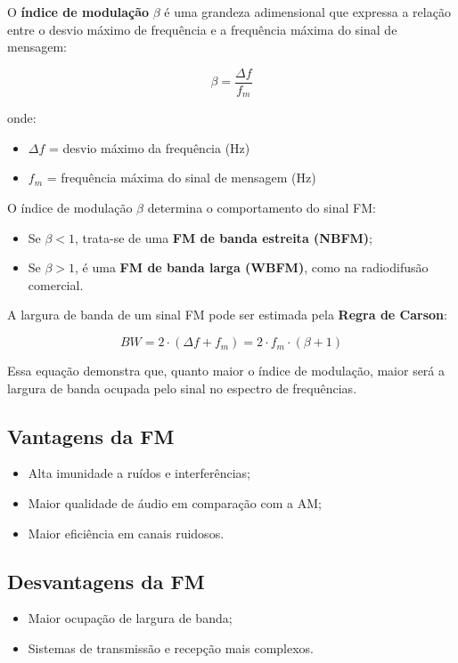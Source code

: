 O \textbf{índice de modulação} $\beta$ é uma grandeza adimensional que expressa a relação entre o desvio máximo de frequência e a frequência máxima do sinal de mensagem:

\begin{equation}
\beta = \frac{\Delta f}{f_m}
\end{equation}

onde:
\begin{itemize}
    \item $\Delta f$ = desvio máximo da frequência (Hz)
    \item $f_m$ = frequência máxima do sinal de mensagem (Hz)
\end{itemize}

O índice de modulação $\beta$ determina o comportamento do sinal FM:
\begin{itemize}
    \item Se $\beta < 1$, trata-se de uma \textbf{FM de banda estreita (NBFM)};
    \item Se $\beta > 1$, é uma \textbf{FM de banda larga (WBFM)}, como na radiodifusão comercial.
\end{itemize}

A largura de banda de um sinal FM pode ser estimada pela \textbf{Regra de Carson}:

\begin{equation}
BW = 2 \cdot (\Delta f + f_m) = 2 \cdot f_m \cdot (\beta + 1)
\end{equation}

Essa equação demonstra que, quanto maior o índice de modulação, maior será a largura de banda ocupada pelo sinal no espectro de frequências.

\subsection*{Vantagens da FM}
\begin{itemize}
    \item Alta imunidade a ruídos e interferências;
    \item Maior qualidade de áudio em comparação com a AM;
    \item Maior eficiência em canais ruidosos.
\end{itemize}

\subsection*{Desvantagens da FM}
\begin{itemize}
    \item Maior ocupação de largura de banda;
    \item Sistemas de transmissão e recepção mais complexos.
\end{itemize}



